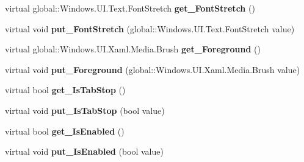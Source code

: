 \begin{DoxyCompactItemize}
virtual global\+::\+Windows.\+U\+I.\+Text.\+Font\+Stretch {\bfseries get\+\_\+\+Font\+Stretch} ()
\item 
\mbox{\label{class_windows_1_1_u_i_1_1_xaml_1_1_controls_1_1_control_adaa41b9c66a1b753259be5ba549c232e}} 
virtual void {\bfseries put\+\_\+\+Font\+Stretch} (global\+::\+Windows.\+U\+I.\+Text.\+Font\+Stretch value)
\item 
\mbox{\label{class_windows_1_1_u_i_1_1_xaml_1_1_controls_1_1_control_a31608c773e66c230ddaf697df9fbfccb}} 
virtual global\+::\+Windows.\+U\+I.\+Xaml.\+Media.\+Brush {\bfseries get\+\_\+\+Foreground} ()
\item 
\mbox{\label{class_windows_1_1_u_i_1_1_xaml_1_1_controls_1_1_control_aaadea9b23ccdedf4680ffca7d20d7a58}} 
virtual void {\bfseries put\+\_\+\+Foreground} (global\+::\+Windows.\+U\+I.\+Xaml.\+Media.\+Brush value)
\item 
\mbox{\label{class_windows_1_1_u_i_1_1_xaml_1_1_controls_1_1_control_a4aed62fb59fe596d9d9727b4fa885234}} 
virtual bool {\bfseries get\+\_\+\+Is\+Tab\+Stop} ()
\item 
\mbox{\label{class_windows_1_1_u_i_1_1_xaml_1_1_controls_1_1_control_a494c6dd6af97e18d86690cb2cae23c3d}} 
virtual void {\bfseries put\+\_\+\+Is\+Tab\+Stop} (bool value)
\item 
\mbox{\label{class_windows_1_1_u_i_1_1_xaml_1_1_controls_1_1_control_ad11dee8e9b7e09556e69903cade192dd}} 
virtual bool {\bfseries get\+\_\+\+Is\+Enabled} ()
\item 
\mbox{\label{class_windows_1_1_u_i_1_1_xaml_1_1_controls_1_1_control_ae951ae9f8506d85d623dc31713092569}} 
virtual void {\bfseries put\+\_\+\+Is\+Enabled} (bool value)
\item 
\mbox{\label{class_windows_1_1_u_i_1_1_xaml_1_1_controls_1_1_control_a58eef00fd623bde61c10893d9205700b}} 

\end{DoxyCompactItemize}
